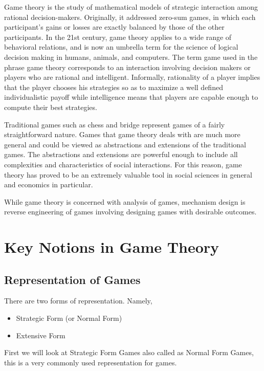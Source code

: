 Game theory is the study of mathematical models of strategic interaction among rational decision-makers.
Originally, it addressed zero-sum games, in which each participant's gains or losses are exactly balanced by those of the other participants.
In the 21st century, game theory applies to a wide range of behavioral relations, and is now an umbrella term for the science of logical decision making in humans, animals, and computers.
The term game used in the phrase game theory corresponds to an interaction involving decision makers or players who are rational and intelligent.
Informally, rationality of a player implies that the player chooses his strategies so as to maximize a well defined individualistic payoff while intelligence means that players are capable enough to compute their best strategies.

Traditional games such as chess and bridge represent games of a fairly straightforward nature.
Games that game theory deals with are much more general and could be viewed as abstractions and extensions of the traditional games.
The abstractions and extensions are powerful enough to include all complexities and characteristics of social interactions.
For this reason, game theory has proved to be an extremely valuable tool in social sciences in general and economics in particular.

While game theory is concerned with analysis of games, mechanism design is reverse engineering of games involving designing games with desirable outcomes.
\section{Key Notions in Game Theory}
\subsection{Representation of Games}
There are two forms of representation. Namely,
\begin{itemize}
    \item Strategic Form (or Normal Form)
    \item Extensive Form
\end{itemize}
First we will look at Strategic Form Games also called as Normal Form Games, this is a very commonly used representation for games.
